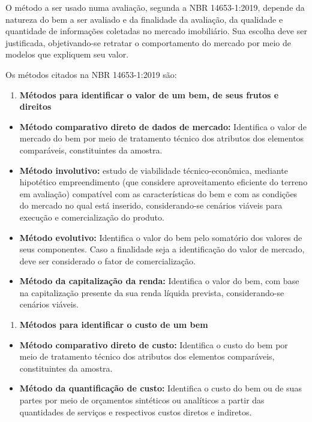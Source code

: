 \documentclass[
  10pt,
  a4paper]{article}
\providecommand{\tightlist}{%
  \setlength{\itemsep}{0pt}\setlength{\parskip}{0pt}}
\begin{document}
O método a ser usado numa avaliação, segunda a NBR 14653-1:2019, depende
da natureza do bem a ser avaliado e da finalidade da avaliação, da
qualidade e quantidade de informações coletadas no mercado imobiliário.
Sua escolha deve ser justificada, objetivando-se retratar o
comportamento do mercado por meio de modelos que expliquem seu valor.

Os métodos citados na NBR 14653-1:2019 são:

\begin{enumerate}
\def\labelenumi{\alph{enumi}.}
\tightlist
\item
  \textbf{Métodos para identificar o valor de um bem, de seus frutos e
  direitos}
\end{enumerate}

\begin{itemize}
\tightlist
\item
  \textbf{Método comparativo direto de dados de mercado:} Identifica o
  valor de mercado do bem por meio de tratamento técnico dos atributos
  dos elementos comparáveis, constituintes da amostra.
\item
  \textbf{Método involutivo:} estudo de viabilidade técnico-econômica,
  mediante hipotético empreendimento (que considere aproveitamento
  eficiente do terreno em avaliação) compatível com as características
  do bem e com as condições do mercado no qual está inserido,
  considerando-se cenários viáveis para execução e comercialização do
  produto.
\item
  \textbf{Método evolutivo:} Identifica o valor do bem pelo somatório
  dos valores de seus componentes. Caso a finalidade seja a
  identificação do valor de mercado, deve ser considerado o fator de
  comercialização.
\item
  \textbf{Método da capitalização da renda:} Identifica o valor do bem,
  com base na capitalização presente da sua renda líquida prevista,
  considerando-se cenários viáveis.
\end{itemize}

\begin{enumerate}
\def\labelenumi{\alph{enumi}.}
\setcounter{enumi}{1}
\tightlist
\item
  \textbf{Métodos para identificar o custo de um bem}
\end{enumerate}

\begin{itemize}
\tightlist
\item
  \textbf{Método comparativo direto de custo:} Identifica o custo do bem
  por meio de tratamento técnico dos atributos dos elementos
  comparáveis, constituintes da amostra.
\item
  \textbf{Método da quantificação de custo:} Identifica o custo do bem
  ou de suas partes por meio de orçamentos sintéticos ou analíticos a
  partir das quantidades de serviços e respectivos custos diretos e
  indiretos.
\end{itemize}
\end{document}
